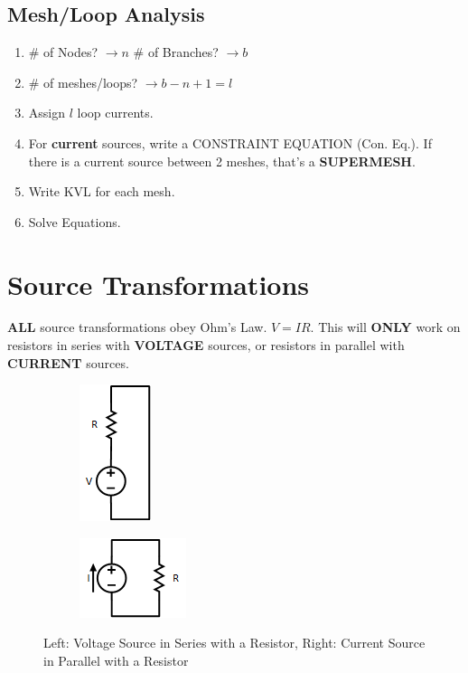 \documentclass[10pt,letterpaper,twoside,notitlepage]{article}
\begin{document}
	\subsection*{Mesh/Loop Analysis}
		\begin{enumerate}
			\item \# of Nodes? $\rightarrow n$ \# of Branches? $\rightarrow b$
			\item \# of meshes/loops? $\rightarrow b-n+1 = l$
			\item Assign $l$ loop currents.
			\item For \textbf{current} sources, write a CONSTRAINT EQUATION (Con. Eq.). If there is a current source between 2 meshes, that's a \textbf{SUPERMESH}.
			\item Write KVL for each mesh.
			\item Solve Equations.
		\end{enumerate}

\section*{Source Transformations}
	\textbf{ALL} source transformations obey Ohm's Law. $V=IR$.
	This will \textbf{ONLY} work on resistors in series with \textbf{VOLTAGE} sources, or resistors in parallel with \textbf{CURRENT} sources.
	\begin{figure}[!htpb]
		\hspace{15mm}
		\begin{subfigure}
			\centering
			\includegraphics[scale=.4]{SeriesVoltageResistor.png}
			\label{fig:SeriesVoltageSource}
		\end{subfigure}
		\hspace{65mm}
		\begin{subfigure}
			\centering
			\includegraphics[scale=.4]{ParallelCurrentResistor.png}
			\label{fig:ParallelCurrentSource}
		\end{subfigure}
		\caption{Left: Voltage Source in Series with a Resistor, Right: Current Source in Parallel with a Resistor}
	\end{figure}
\newpage
\end{document}

